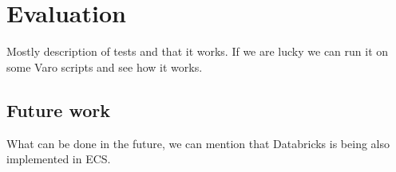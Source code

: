 \chapter{Evaluation}

Mostly description of tests and that it works. If we are lucky we can run it on some Varo scripts and see how it works.

\section{Future work}
What can be done in the future, we can mention that Databricks is being also implemented in ECS.